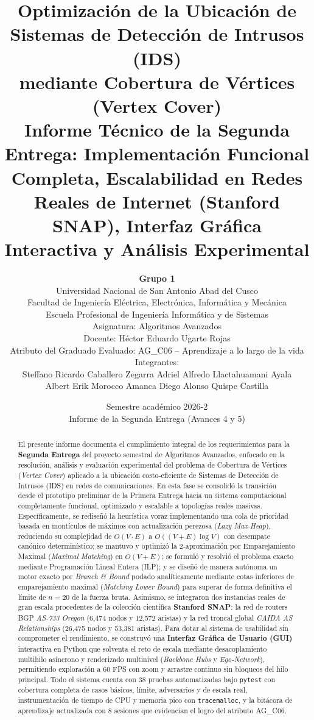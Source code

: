 \documentclass[11pt,a4paper]{article}
\title{
	\vspace{-1cm}
	\textbf{Optimización de la Ubicación de Sistemas de Detección de Intrusos (IDS) \\
	mediante Cobertura de Vértices (Vertex Cover)} \\
	\large Informe Técnico de la Segunda Entrega: Implementación Funcional Completa, Escalabilidad en Redes Reales de Internet (Stanford SNAP), Interfaz Gráfica Interactiva y Análisis Experimental
}
\author{
	\textbf{Grupo 1} \\
	\small Universidad Nacional de San Antonio Abad del Cusco \\
	\small Facultad de Ingeniería Eléctrica, Electrónica, Informática y Mecánica \\
	\small Escuela Profesional de Ingeniería Informática y de Sistemas \\
	\small Asignatura: Algoritmos Avanzados \\
	\small Docente: Héctor Eduardo Ugarte Rojas \\
	\small Atributo del Graduado Evaluado: AG\_C06 -- Aprendizaje a lo largo de la vida \\
	\small Integrantes: \\
	\small Steffano Ricardo Caballero Zegarra \quad Adriel Alfredo Llactahuamani Ayala \\
	\small Albert Erik Morocco Amanca \quad Diego Alonso Quispe Castilla
}
\date{Semestre académico 2026-2 \\ Informe de la Segunda Entrega (Avances 4 y 5)}
\begin{document}
\maketitle
\thispagestyle{fancy}

\begin{abstract}
\noindent
El presente informe documenta el cumplimiento integral de los requerimientos para la \textbf{Segunda Entrega} del proyecto semestral de Algoritmos Avanzados, enfocado en la resolución, análisis y evaluación experimental del problema de Cobertura de Vértices (\textit{Vertex Cover}) aplicado a la ubicación costo-eficiente de Sistemas de Detección de Intrusos (IDS) en redes de comunicaciones. En esta fase se consolidó la transición desde el prototipo preliminar de la Primera Entrega hacia un sistema computacional completamente funcional, optimizado y escalable a topologías reales masivas. Específicamente, se rediseñó la heurística voraz implementando una cola de prioridad basada en montículos de máximos con actualización perezosa (\textit{Lazy Max-Heap}), reduciendo su complejidad de $O(V \cdot E)$ a $O((V+E)\log V)$ con desempate canónico determinístico; se mantuvo y optimizó la 2-aproximación por Emparejamiento Maximal (\textit{Maximal Matching}) en $O(V+E)$; se formuló y resolvió el problema exacto mediante Programación Lineal Entera (ILP); y se diseñó de manera autónoma un motor exacto por \textit{Branch \& Bound} podado analíticamente mediante cotas inferiores de emparejamiento maximal (\textit{Matching Lower Bound}) para superar de forma definitiva el límite de $n=20$ de la fuerza bruta. Asimismo, se integraron dos instancias reales de gran escala procedentes de la colección científica \textbf{Stanford SNAP}: la red de routers BGP \textit{AS-733 Oregon} (6,474 nodos y 12,572 aristas) y la red troncal global \textit{CAIDA AS Relationships} (26,475 nodos y 53,381 aristas). Para dotar al sistema de usabilidad sin comprometer el rendimiento, se construyó una \textbf{Interfaz Gráfica de Usuario (GUI)} interactiva en Python que solventa el reto de escala mediante desacoplamiento multihilo asíncrono y renderizado multinivel (\textit{Backbone Hubs} y \textit{Ego-Network}), permitiendo exploración a 60 FPS con zoom y arrastre continuo sin bloqueos del hilo principal. Todo el sistema cuenta con 38 pruebas automatizadas bajo \texttt{pytest} con cobertura completa de casos básicos, límite, adversarios y de escala real, instrumentación de tiempo de CPU y memoria pico con \texttt{tracemalloc}, y la bitácora de aprendizaje actualizada con 8 sesiones que evidencian el logro del atributo AG\_C06.
\end{abstract}
\end{document}
